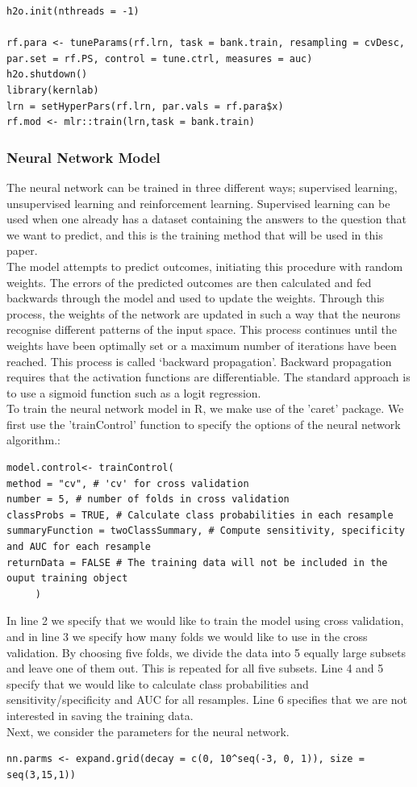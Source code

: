 \begin{lstlisting}
h2o.init(nthreads = -1)

rf.para <- tuneParams(rf.lrn, task = bank.train, resampling = cvDesc, par.set = rf.PS, control = tune.ctrl, measures = auc)
h2o.shutdown()
library(kernlab)
lrn = setHyperPars(rf.lrn, par.vals = rf.para$x)
rf.mod <- mlr::train(lrn,task = bank.train)
\end{lstlisting}
     \subsubsection{Neural Network Model}
        \noindent The neural network can be trained in three different ways; supervised learning, unsupervised learning and reinforcement learning. Supervised learning can be used when one already has a dataset containing the answers to the question that we want to predict, and this is the training method that will be used in this paper.\\
     The model attempts to predict outcomes, initiating this procedure with random weights. The errors of the predicted outcomes are then calculated and fed backwards through the model and used to update the weights. Through this process, the weights of the network are updated in such a way that the neurons recognise different patterns of the input space. This process continues until the weights have been optimally set or a maximum number of iterations have been reached. This process is called ‘backward propagation’. Backward propagation requires that the activation functions are differentiable. The standard approach is to use a sigmoid function such as a logit regression.\\
     [\baselineskip]\indent To train the neural network model in R, we make use of the 'caret' package. We first use the 'trainControl' function to specify the options of the neural network algorithm.:
     \begin{lstlisting}
model.control<- trainControl(
method = "cv", # 'cv' for cross validation
number = 5, # number of folds in cross validation
classProbs = TRUE, # Calculate class probabilities in each resample
summaryFunction = twoClassSummary, # Compute sensitivity, specificity and AUC for each resample
returnData = FALSE # The training data will not be included in the ouput training object
     )
     \end{lstlisting}
     \indent In line 2 we specify that we would like to train the model using cross validation, and in line 3 we specify how many folds we would like to use in the cross validation. By choosing five folds, we divide the data into 5 equally large subsets and leave one of them out. This is repeated for all five subsets. Line 4 and 5 specify that we would like to calculate class probabilities and sensitivity/specificity and AUC for all resamples. Line 6 specifies that we are not interested in saving the training data.\\
     Next, we consider the parameters for the neural network.
     \begin{lstlisting}
nn.parms <- expand.grid(decay = c(0, 10^seq(-3, 0, 1)), size = seq(3,15,1))
     \end{lstlisting}
     

